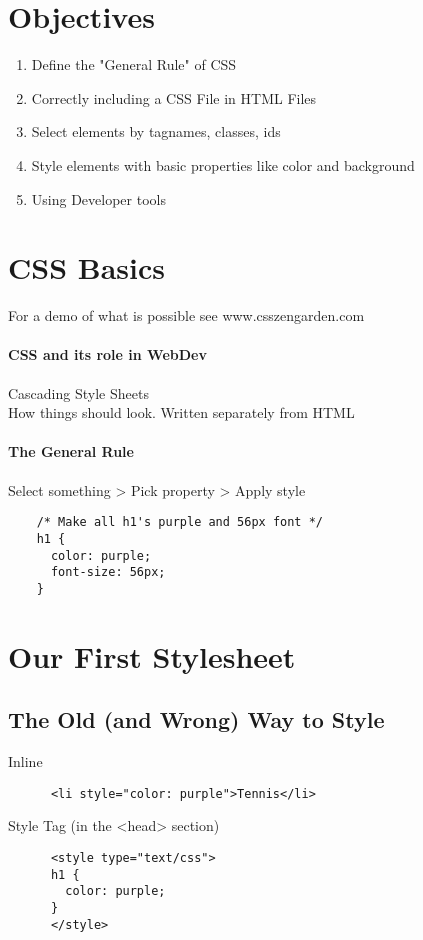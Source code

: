 \documentclass{article}
\begin{document}
	
	\title{}
	\author{Nico Limacher}
	
\maketitle
\section{Objectives}

\begin{enumerate}
	\itemsep0em
	\item Define the "General Rule" of CSS
	\item Correctly including a CSS File in HTML Files
	\item Select elements by tagnames, classes, ids
	\item Style elements with basic properties like color and background
	\item Using Developer tools
\end{enumerate}

\section{CSS Basics}
	For a demo of what is possible see www.csszengarden.com
	\paragraph*{CSS and its role in WebDev}
	Cascading Style Sheets\\How things should look. Written separately from HTML
	\paragraph*{The General Rule} Select something > Pick property > Apply style
	\begin{verbatim}
	/* Make all h1's purple and 56px font */
	h1 {
	  color: purple;
	  font-size: 56px;
	}
	\end{verbatim}

\section{Our First Stylesheet}
	
	\subsection{The Old (and Wrong) Way to Style}
	Inline
	\begin{verbatim}
	  <li style="color: purple">Tennis</li>
	\end{verbatim}
	Style Tag (in the <head> section)
	\begin{verbatim}
	  <style type="text/css">
	  h1 {
	    color: purple;
	  }
	  </style>
	\end{verbatim}
\end{document}
